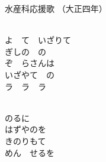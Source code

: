 \documentclass[10pt,b5j]{tarticle} %
\begin{document}
\begin{minipage}[c]{0.7\hsize} %
    \begin{center}
        {\LARGE
            水産科応援歌 %
        }
        {\small 
            （大正四年） %
        }
    \end{center}
\end{minipage}
\begin{minipage}[c]{0.3\hsize} %
    \begin{flushright} %
    \end{flushright}
\end{minipage}

\vspace{1.5em} %
\newcommand{\linespace}{0.5em} %
\newcommand{\blocksize}{0.5\hsize} %
\newcommand{\itemmargin}{6em} %
\begin{enumerate} %
    \setlength{\itemindent}{\itemmargin} %
    \begin{minipage}[c]{\blocksize}
    
        \vspace{\linespace}
        \item~\\
        よ　て　いざりて\\
        ぎしの　の\\
        ぞ　らさんは\\
        いざやて　の\\
        ラ　ラ　ラ
        
        \vspace{\linespace}
        \item~\\
        のるに\\
        はずやのを\\
        きのりもて\\
        めん　せるを
    
    \end{minipage}
\end{enumerate} %
\end{document}
